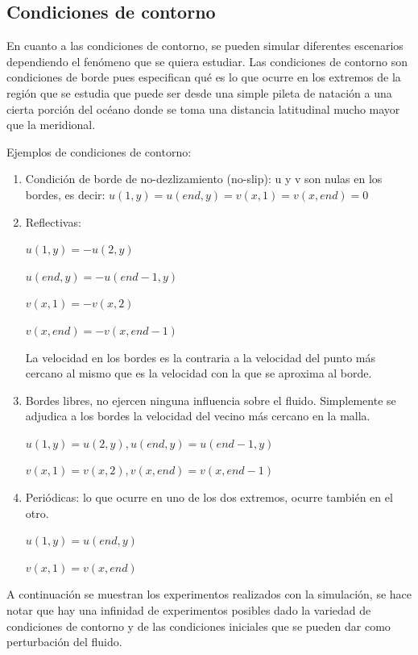 \documentclass[12pt,dvipsnames]{exam}
\begin{document}
\subsection{Condiciones de contorno}

En cuanto a las condiciones de contorno, se pueden simular diferentes escenarios dependiendo el fenómeno que se quiera estudiar. Las condiciones de contorno son condiciones de borde pues especifican qué es lo que ocurre en los extremos de la región que se estudia que puede ser desde una simple pileta de natación a una cierta porción del océano donde se toma una distancia latitudinal mucho mayor que la meridional.

Ejemplos de condiciones de contorno:
\begin{enumerate}
    \item Condición de borde de no-dezlizamiento (no-slip): u y v son nulas en los bordes, es decir: $u(1,y) = u(end,y) = v(x,1) = v(x,end) = 0$
    \item Reflectivas: 
    
    $u(1,y) = -u(2,y)$
    
    $u(end,y) = - u(end-1,y)$ 
    
    $v(x,1) = -v(x,2)$
    
    $v(x,end) = - v(x,end-1)$
    
La velocidad en los bordes es la contraria a la velocidad del punto más cercano al mismo que es la velocidad con la que se aproxima al borde.

\item Bordes libres, no ejercen ninguna influencia sobre el fluido. Simplemente se adjudica a los bordes la velocidad del vecino más cercano en la malla.

$u(1,y) = u(2,y) , u(end,y) = u(end-1,y)$

$v(x,1) = v(x,2) , v(x,end) = v(x,end-1)$


\item Periódicas: lo que ocurre en uno de los dos extremos, ocurre también en el otro.

$u(1,y) = u(end,y)$


$v(x,1) = v(x,end)$

\end{enumerate}
 A continuación se muestran los experimentos realizados con la simulación, se hace notar que hay una infinidad de experimentos posibles dado la variedad de condiciones de contorno y de las condiciones iniciales que se pueden dar como perturbación del fluido.
 
\end{document}
